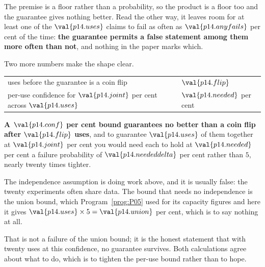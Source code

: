 \begin{fr}
The premise is a floor rather than a probability, so the product is a floor
too and the guarantee gives nothing better. Read the other way, it leaves
room for at least one of the $\val{p14.uses}$ claims to fail as often as
$\val{p14.anyfails}$ per cent of the time: \textbf{the guarantee permits a
false statement among them more often than not}, and nothing in the paper
marks which.

Two more numbers make the shape clear.

\begin{center}
\begin{tabular}{ll}
\toprule
uses before the guarantee is a coin flip & $\val{p14.flip}$ \\
per-use confidence for $\val{p14.joint}$ per cent across $\val{p14.uses}$
  & $\val{p14.needed}$ per cent \\
\bottomrule
\end{tabular}
\end{center}

\textbf{A $\val{p14.conf}$ per cent bound guarantees no better than a coin
flip after $\val{p14.flip}$ uses}, and to guarantee $\val{p14.uses}$ of them
together at $\val{p14.joint}$ per cent you would need each to hold at
$\val{p14.needed}$ per cent \dash{} a failure probability of
$\val{p14.neededdelta}$ per cent rather than $5$, nearly twenty times
tighter.

\begin{note}
The independence assumption is doing work above, and it is usually false: the
twenty experiments often share data. The bound that needs no independence is
the union bound, which Program~\ref{prog:P05} used for its capacity figures
\dash{} and here it gives $\val{p14.uses} \times 5 = \val{p14.union}$ per
cent, which is to say nothing at all.

That is not a failure of the union bound; it is the honest statement that with
twenty uses at this confidence, no guarantee survives. Both calculations agree
about what to do, which is to tighten the per-use bound rather than to hope.
\end{note}
\end{fr}

